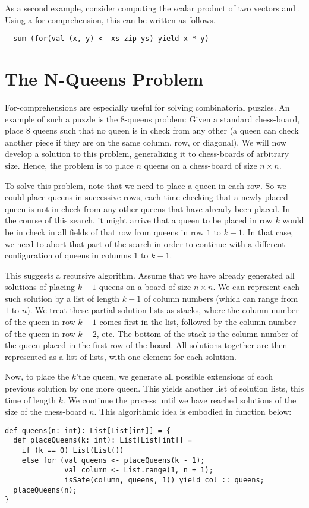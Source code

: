 As a second example, consider computing the scalar product of two
vectors  and . Using a for-comprehension, this can
be written as follows.
\begin{lstlisting}
  sum (for(val (x, y) <- xs zip ys) yield x * y)
\end{lstlisting}

\section{The N-Queens Problem}

For-comprehensions are especially useful for solving combinatorial
puzzles. An example of such a puzzle is the 8-queens problem: Given a
standard chess-board, place 8 queens such that no queen is in check from any
other (a queen can check another piece if they are on the same
column, row, or diagonal). We will now develop a solution to this
problem, generalizing it to chess-boards of arbitrary size. Hence, the
problem is to place $n$ queens on a chess-board of size $n \times n$.

To solve this problem, note that we need to place a queen in each row.
So we could place queens in successive rows, each time checking that a
newly placed queen is not in check from any other queens that have
already been placed. In the course of this search, it might arrive
that a queen to be placed in row $k$ would be in check in all fields
of that row from queens in row $1$ to $k-1$. In that case, we need to
abort that part of the search in order to continue with a different
configuration of queens in columns $1$ to $k-1$.

This suggests a recursive algorithm.  Assume that we have already
generated all solutions of placing $k-1$ queens on a board of size $n
\times n$. We can represent each such solution by a list of length
$k-1$ of column numbers (which can range from $1$ to $n$).  We treat
these partial solution lists as stacks, where the column number of the
queen in row $k-1$ comes first in the list, followed by the column
number of the queen in row $k-2$, etc. The bottom of the stack is the
column number of the queen placed in the first row of the board.  All
solutions together are then represented as a list of lists, with one
element for each solution.

Now, to place the $k$'the queen, we generate all possible extensions
of each previous solution by one more queen. This yields another list
of solution lists, this time of length $k$. We continue the process
until we have reached solutions of the size of the chess-board $n$.
This algorithmic idea is embodied in function  below:
\begin{lstlisting}
def queens(n: int): List[List[int]] = {
  def placeQueens(k: int): List[List[int]] =
    if (k == 0) List(List())
    else for (val queens <- placeQueens(k - 1);
              val column <- List.range(1, n + 1);
              isSafe(column, queens, 1)) yield col :: queens;
  placeQueens(n);
}
\end{lstlisting}

